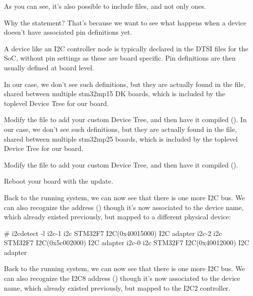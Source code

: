 As you can see, it's also possible to include  files, and not
only  ones.

Why the  statement? That's because we want
to see what happens when a device doesn't have associated pin
definitions yet.

A device like an I2C controller node is typically declared in the DTSI
files for the SoC, without pin settings as these are board
specific. Pin definitions are then usually defined at board level.

\if{}
In our case, we don't see such definitions, but they are actually
found in the 
file, shared between multiple stm32mp15 DK boards, which is included
by the toplevel Device Tree for our board.

Modify the  file to add your custom
Device Tree, and then have it compiled ().
\fi
\if{}
In our case, we don't see such definitions, but they are actually
found in the 
file, shared between multiple stm32mp25 boards, which is included
by the toplevel Device Tree for our board.

Modify the  file to add your custom
Device Tree, and then have it compiled ().
\fi

Reboot your board with the update.

\if{}
Back to the running system, we can now see that there is one more
I2C bus. We can also recognize the \busname address ()
though it's now associated to the  device name, which
already existed previously, but mapped to a different physical device:

\begin{bashinput}
# i2cdetect -l
i2c-1	i2c             STM32F7 I2C(0x40015000)                 I2C adapter
i2c-2	i2c             STM32F7 I2C(0x5c002000)                 I2C adapter
i2c-0	i2c             STM32F7 I2C(0x40012000)                 I2C adapter
\end{bashinput}
\fi
\if{}
Back to the running system, we can now see that there is one more
I2C bus. We can also recognize the I2C8 address ()
though it's now associated to the  device name, which
already existed previously, but mapped to the I2C2 controller.

